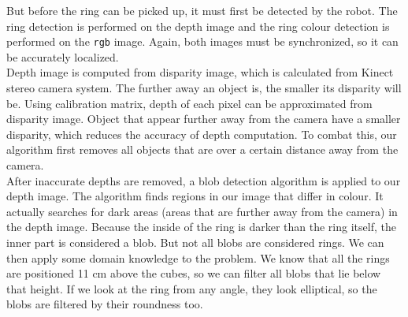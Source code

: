 \documentclass[12pt,a4paper]{article}
\begin{document}
	But before the ring can be picked up, it must first be detected by the robot. The ring detection is performed on the depth image and the ring colour detection is performed on the \texttt{rgb} image. Again, both images must be synchronized, so it can be accurately localized. \\
	
	Depth image is computed from disparity image, which is calculated from Kinect stereo camera system. The further away an object is, the smaller its disparity will be. Using calibration matrix, depth of each pixel can be approximated from disparity image. Object that appear further away from the camera have a smaller disparity, which reduces the accuracy of depth computation. To combat this, our algorithm first removes all objects that are over a certain distance away from the camera. \\
	
	After inaccurate depths are removed, a blob detection algorithm is applied to our depth image. The algorithm finds regions in our image that differ in colour. It actually searches for dark areas (areas that are further away from the camera) in the depth image. Because the inside of the ring is darker than the ring itself, the inner part is considered a blob. But not all blobs are considered rings. We can then apply some domain knowledge to the problem. We know that all the rings are positioned 11 cm above the cubes, so we can filter all blobs that lie below that height. If we look at the ring from any angle, they look elliptical, so the blobs are filtered by their roundness too. \\
	
\end{document}
